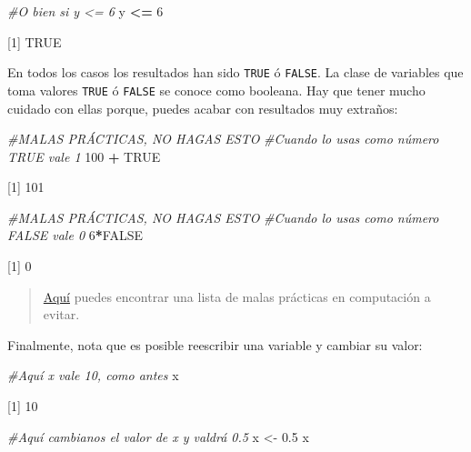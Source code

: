 \documentclass[
]{book}
\newenvironment{Shaded}{\begin{snugshade}}{\end{snugshade}}
\newcommand{\CommentTok}[1]{\textcolor[rgb]{0.56,0.35,0.01}{\textit{#1}}}
\newcommand{\DecValTok}[1]{\textcolor[rgb]{0.00,0.00,0.81}{#1}}
\newcommand{\FloatTok}[1]{\textcolor[rgb]{0.00,0.00,0.81}{#1}}
\newcommand{\NormalTok}[1]{#1}
\newcommand{\OperatorTok}[1]{\textcolor[rgb]{0.81,0.36,0.00}{\textbf{#1}}}
\newcommand{\OtherTok}[1]{\textcolor[rgb]{0.56,0.35,0.01}{#1}}
\newcommand{\StringTok}[1]{\textcolor[rgb]{0.31,0.60,0.02}{#1}}
\begin{document}
\begin{Shaded}
\begin{Highlighting}[]
\CommentTok{#O bien si y <= 6}
\NormalTok{y }\OperatorTok{<=}\StringTok{ }\DecValTok{6}
\end{Highlighting}
\end{Shaded}

{[}1{]} TRUE

En todos los casos los resultados han sido \texttt{TRUE} ó \texttt{FALSE}. La clase de variables que toma valores \texttt{TRUE} ó \texttt{FALSE} se conoce como booleana. Hay que tener mucho cuidado con ellas porque, puedes acabar con resultados muy extraños:

\begin{Shaded}
\begin{Highlighting}[]
\CommentTok{#MALAS PRÁCTICAS, NO HAGAS ESTO}
\CommentTok{#Cuando lo usas como número TRUE vale 1}
\DecValTok{100} \OperatorTok{+}\StringTok{ }\OtherTok{TRUE}
\end{Highlighting}
\end{Shaded}

{[}1{]} 101

\begin{Shaded}
\begin{Highlighting}[]
\CommentTok{#MALAS PRÁCTICAS, NO HAGAS ESTO}
\CommentTok{#Cuando lo usas como número FALSE vale 0}
\DecValTok{6}\OperatorTok{*}\OtherTok{FALSE}
\end{Highlighting}
\end{Shaded}

{[}1{]} 0

\begin{quote}
\href{https://medium.com/mindorks/common-bad-programming-practices-7fb470ed74d2}{Aquí} puedes encontrar una lista de malas prácticas en computación a evitar.
\end{quote}

Finalmente, nota que es posible reescribir una variable y cambiar su valor:

\begin{Shaded}
\begin{Highlighting}[]
\CommentTok{#Aquí x vale 10, como antes}
\NormalTok{x}
\end{Highlighting}
\end{Shaded}

{[}1{]} 10

\begin{Shaded}
\begin{Highlighting}[]
\CommentTok{#Aquí cambianos el valor de x y valdrá 0.5}
\NormalTok{x <-}\StringTok{ }\FloatTok{0.5}
\NormalTok{x}
\end{Highlighting}
\end{Shaded}
\end{document}
